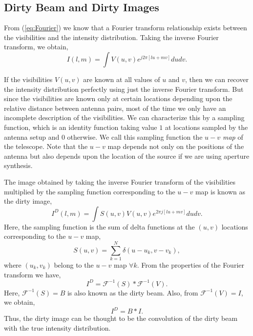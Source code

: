 \subsection{Dirty Beam and Dirty Images}
\label{sec:dirty}
From (\ref{eq:Fourier}) we know that  a Fourier transform relationship exists between the visibilities and the intensity distribution.
Taking the inverse Fourier transform, we obtain,
\begin{equation}
  {I}(l,m)  = \int {V}(u,v) {e^{ j{2\pi} [lu + mv ]}} {du dv}.
\end{equation}

If the visibilities $V(u,v)$ are known at all values of $u$ and $v$, then we can recover the intensity distribution perfectly using just the inverse Fourier transform. But since the visibilities are known only at certain locations depending upon the relative distance between antenna pairs, most of the time we only have an incomplete description of the visibilities. We can characterize this by a sampling function, which is an identity function taking value $1$ at locations sampled by the antenna setup and $0$ otherwise. We call this sampling function the \emph{$u-v$ map} of the telescope.  Note that the $u-v$ map depends not only on the positions of the antenna but also depends upon the location of the source if we are using aperture synthesis.

The image obtained by taking the inverse Fourier transform of the visibilities multiplied by the sampling function corresponding to the $u-v$ map is known as the dirty image,
\begin{equation}
  I^D(l,m)  = \int {S}(u,v) {V}(u,v) {e^{ {2\pi} j[lu + mv ]}} {du dv}.
\end{equation}
Here, the sampling function is the sum of delta functions at the $(u,v)$ locations corresponding to the $u-v$ map,
\begin{equation}
  {S}(u,v) = \sum_{k=1}^{N} \delta ( u-u_k,v-v_k), 
\end{equation}
where $(u_k, v_k)$ belong to the $u-v$ map $\forall k$.
From the properties of the Fourier transform we have,
\begin{equation}
 I^D = \mathcal{F}^{-1}(S) * \mathcal{F}^{-1}(V).
\end{equation}
Here, $ \mathcal{F}^{-1}(S) = B$ is also known as the dirty beam. Also, from $\mathcal{F}^{-1}(V) ={I}$, we obtain,
\begin{equation}
 I^D = B * {I}.
\label{eq:dirtytrue}
\end{equation}
Thus, the dirty image can be thought to be the convolution of the dirty beam with the true intensity 
distribution.

